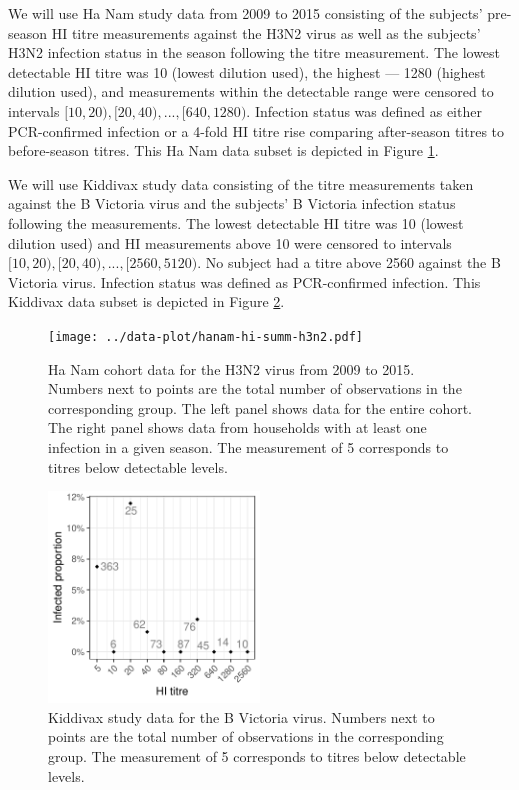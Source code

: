 We will use Ha Nam study data from 2009 to 2015 consisting of the subjects' pre-season HI titre measurements against the H3N2 virus as well as the subjects' H3N2 infection status in the season following the titre measurement. The lowest detectable HI titre was 10 (lowest dilution used), the highest --- 1280 (highest dilution used), and measurements within the detectable range were censored to intervals $[10, 20), [20, 40), ..., [640, 1280)$. Infection status was defined as either PCR-confirmed infection or a 4-fold HI titre rise comparing after-season titres to before-season titres. This Ha Nam data subset is depicted in Figure \ref{fig:hanam-hi-summ-h3n2}.

We will use Kiddivax study data consisting of the titre measurements taken against the B Victoria virus and the subjects' B Victoria infection status following the measurements. The lowest detectable HI titre was 10 (lowest dilution used) and HI measurements above 10 were censored to intervals $[10, 20), [20, 40), ..., [2560, 5120)$. No subject had a titre above 2560 against the B Victoria virus. Infection status was defined as PCR-confirmed infection. This Kiddivax data subset is depicted in Figure \ref{fig:kiddivax-main-summ}.

\begin{figure}[htp]
    \centering
    \texttt{[image: ../data-plot/hanam-hi-summ-h3n2.pdf]}
    \caption{
        Ha Nam cohort data for the H3N2 virus from 2009 to 2015. Numbers next to points are the total number of observations in the corresponding group. The left panel shows data for the entire cohort. The right panel shows data from households with at least one infection in a given season. The measurement of 5 corresponds to titres below detectable levels.
    }
    \label{fig:hanam-hi-summ-h3n2}
\end{figure}

\begin{figure}[htp]
    \centering
    \includegraphics[width=0.5\textwidth]{../data-plot/kiddyvax-main-summ.pdf}
    \caption{
        Kiddivax study data for the B Victoria virus. Numbers next to points are the total number of observations in the corresponding group. The measurement of 5 corresponds to titres below detectable levels.
    }
    \label{fig:kiddivax-main-summ}
\end{figure}
